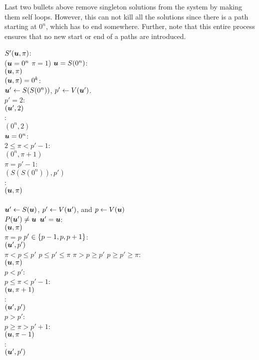 Last two bullets above remove singleton solutions from the system by making them
self loops. However, this can not kill all the solutions since there is a path
starting at $0^n$, which has to end somewhere. Further, note that this entire process ensures that no new start or end of a paths are introduced. 
\medskip
\medskip

\begin{algo}
  \underline{$S'(\mbox{\boldmath $u$},\pi)$}:\+
  \\\IfB ($\mbox{\boldmath $u$}=0^n$ \AndB $\pi=1$) \OrB $\mbox{\boldmath $u$}=S(0^n)$:\+
  \\  \ReturnB $(\mbox{\boldmath $u$},\pi)$\-
  \\\IfB $(\mbox{\boldmath $u$},\pi)=0^k$:\+
  \\  $\mbox{\boldmath $u$}'\gets S(S(0^n))$, $p'\gets V(\mbox{\boldmath $u$}')$. 
  \\  \IfB $p'=2$:\+
  \\    \ReturnB $(\mbox{\boldmath $u$}',2)$\-
  \\   \ElseB:\+
  \\     \ReturnB $(0^n,2)$\-\-
  \\\IfB $\mbox{\boldmath $u$}=0^n$:\+
  \\  \IfB $2\le \pi<p'-1$:\+
  \\    \ReturnB $(0^n,\pi+1)$\-
  \\  \ElseIfB $\pi=p'-1$:\+
  \\    \ReturnB $(S(S(0^n)),p')$\-
  \\  \ElseB:\quad{}\+
  \\    \ReturnB $(\mbox{\boldmath $u$},\pi)$\-\-
  \\
  \\$\mbox{\boldmath $u$}'\gets S(\mbox{\boldmath $u$})$, $p'\gets V(\mbox{\boldmath $u$}')$, and $p\gets V(\mbox{\boldmath $u$})$
  \\\IfB $P(\mbox{\boldmath $u$}')\neq \mbox{\boldmath $u$}$ \OrB $\mbox{\boldmath $u$}'=\mbox{\boldmath $u$}$: \+
  \\  \ReturnB $(\mbox{\boldmath $u$},\pi)$\-
  \\\IfB $\pi=p$ \AndB $p' \in \left\{ p-1,p,p+1 \right\}$:\+
  \\  \ReturnB $(\mbox{\boldmath $u$}',p')$\-
  \\\IfB $\pi<p\le p'$ \OrB $p\le p'\le \pi$ \OrB $\pi>p\ge p'$ \OrB $p\ge p'\ge \pi$:\+
  \\  \ReturnB $(\mbox{\boldmath $u$},\pi)$\-
  \\\ElseIfB $p<p'$:\+
  \\  \IfB $p\le \pi<p'-1$:\+
  \\    \ReturnB $(\mbox{\boldmath $u$},\pi+1)$\-
  \\  \ElseB:\quad{}\+
  \\    \ReturnB $(\mbox{\boldmath $u$}',p')$\-\-
  \\\ElseIfB $p>p'$:\+
  \\  \IfB $p \ge \pi>p'+1$:\+
  \\    \ReturnB $(\mbox{\boldmath $u$},\pi-1)$\-
  \\  \ElseB:\quad{}\+
  \\    \ReturnB $(\mbox{\boldmath $u$}',p')$\-\-
\end{algo}

